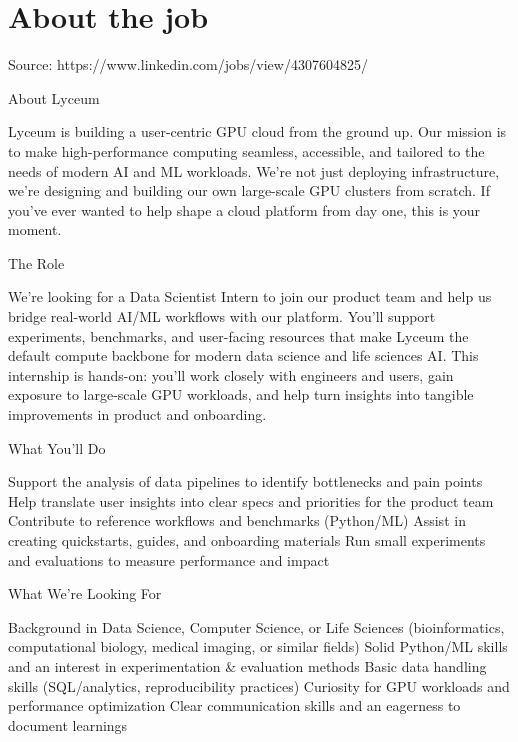 \documentclass[a4paper,11pt]{article}
\begin{document}
	
	

	\section{About the job}

Source: https://www.linkedin.com/jobs/view/4307604825/

About Lyceum

Lyceum is building a user-centric GPU cloud from the ground up. Our mission is to make high-performance computing seamless, accessible, and tailored to the needs of modern AI and ML workloads. We're not just deploying infrastructure, we're designing and building our own large-scale GPU clusters from scratch. If you've ever wanted to help shape a cloud platform from day one, this is your moment.


The Role

We're looking for a Data Scientist Intern to join our product team and help us bridge real-world AI/ML workflows with our platform. You'll support experiments, benchmarks, and user-facing resources that make Lyceum the default compute backbone for modern data science and life sciences AI.
This internship is hands-on: you'll work closely with engineers and users, gain exposure to large-scale GPU workloads, and help turn insights into tangible improvements in product and onboarding.


What You'll Do

Support the analysis of data pipelines to identify bottlenecks and pain points
Help translate user insights into clear specs and priorities for the product team
Contribute to reference workflows and benchmarks (Python/ML)
Assist in creating quickstarts, guides, and onboarding materials
Run small experiments and evaluations to measure performance and impact


What We're Looking For

Background in Data Science, Computer Science, or Life Sciences (bioinformatics, computational biology, medical imaging, or similar fields)
Solid Python/ML skills and an interest in experimentation & evaluation methods
Basic data handling skills (SQL/analytics, reproducibility practices)
Curiosity for GPU workloads and performance optimization
Clear communication skills and an eagerness to document learnings
\end{document}
